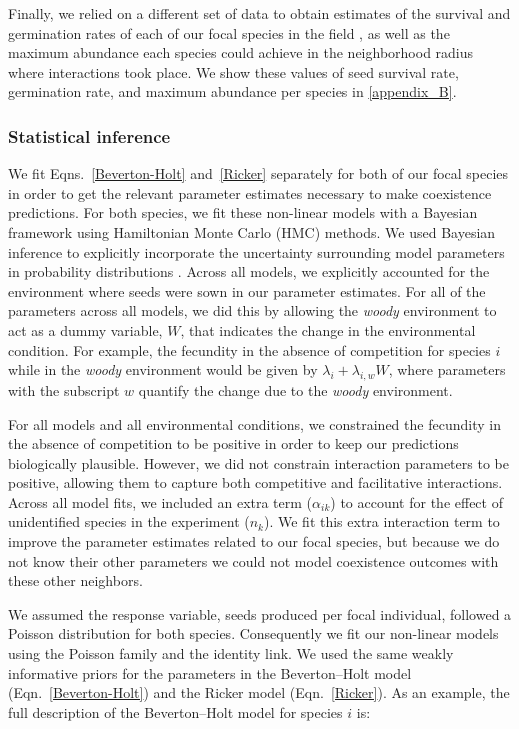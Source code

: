 \begin{refsection}
Finally, we relied on a different set of data to obtain estimates of the survival and germination rates of each of our focal species in the field \citep{towers2021variable}, as well as the maximum abundance each species could achieve in the neighborhood radius where interactions took place. We show these values of seed survival rate, germination rate, and maximum abundance per species in \autoref{appendix_B}.

\subsubsection*{Statistical inference}

We fit Eqns.~\ref{Beverton-Holt} and~\ref{Ricker} separately for both of our focal species in order to get the relevant parameter estimates necessary to make coexistence predictions. For both species, we fit these non-linear models with a Bayesian framework using Hamiltonian Monte Carlo (HMC) methods. We used Bayesian inference to explicitly incorporate the uncertainty surrounding model parameters in probability distributions \citep{mcelreath_statistical_2018}. Across all models, we explicitly accounted for the environment where seeds were sown in our parameter estimates. For all of the parameters across all models, we did this by allowing the \textit{woody} environment to act as a dummy variable, $W$, that indicates the change in the environmental condition. For example, the fecundity in the absence of competition for species $i$ while in the \textit{woody} environment would be given by $\lambda_{i} + \lambda_{i,w}W$, where parameters with the subscript $w$ quantify the change due to the \textit{woody} environment.


For all models and all environmental conditions, we constrained the fecundity in the absence of competition  to be positive in order to keep our predictions biologically plausible. However, we did not constrain interaction parameters to be positive, allowing them to capture both competitive and facilitative interactions. Across all model fits, we included an extra term ($\alpha_{ik}$) to account for the effect of unidentified species in the experiment ($n_{k}$). We fit this extra interaction term to improve the parameter estimates  related to our focal species, but because we do not know their other parameters we could not model coexistence outcomes with these other neighbors.

We assumed the response variable, seeds produced per focal individual, followed a Poisson distribution for both species. Consequently we fit our non-linear models using the Poisson family and the identity link. We used the same weakly informative priors for the parameters in the Beverton--Holt model (Eqn.~\ref{Beverton-Holt}) and the Ricker model (Eqn.~\ref{Ricker}). As an example, the full description of the Beverton--Holt model for species $i$ is:


\end{refsection}
